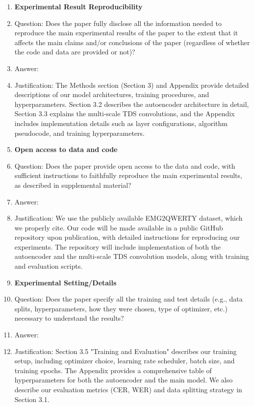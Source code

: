 \begin{enumerate}
\item {\bf Experimental Result Reproducibility}
    \item[] Question: Does the paper fully disclose all the information needed to reproduce the main experimental results of the paper to the extent that it affects the main claims and/or conclusions of the paper (regardless of whether the code and data are provided or not)?
    \item[] Answer: \answerYes{}
    \item[] Justification: The Methods section (Section 3) and Appendix provide detailed descriptions of our model architectures, training procedures, and hyperparameters. Section 3.2 describes the autoencoder architecture in detail, Section 3.3 explains the multi-scale TDS convolutions, and the Appendix includes implementation details such as layer configurations, algorithm pseudocode, and training hyperparameters.

\item {\bf Open access to data and code}
    \item[] Question: Does the paper provide open access to the data and code, with sufficient instructions to faithfully reproduce the main experimental results, as described in supplemental material?
    \item[] Answer: \answerYes{}
    \item[] Justification: We use the publicly available EMG2QWERTY dataset, which we properly cite. Our code will be made available in a public GitHub repository upon publication, with detailed instructions for reproducing our experiments. The repository will include implementation of both the autoencoder and the multi-scale TDS convolution models, along with training and evaluation scripts.

\item {\bf Experimental Setting/Details}
    \item[] Question: Does the paper specify all the training and test details (e.g., data splits, hyperparameters, how they were chosen, type of optimizer, etc.) necessary to understand the results?
    \item[] Answer: \answerYes{}
    \item[] Justification: Section 3.5 "Training and Evaluation" describes our training setup, including optimizer choice, learning rate scheduler, batch size, and training epochs. The Appendix provides a comprehensive table of hyperparameters for both the autoencoder and the main model. We also describe our evaluation metrics (CER, WER) and data splitting strategy in Section 3.1.


\end{enumerate}
